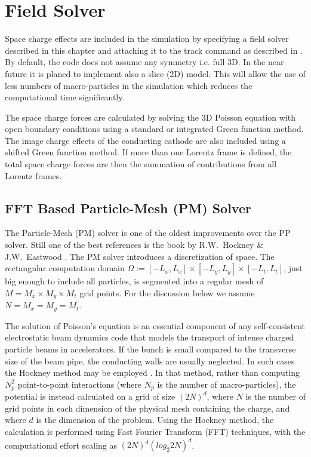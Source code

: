 

\chapter{Field Solver}
\label{chp:fieldsolver}

Space charge effects are included in the simulation by specifying a field solver described in this chapter and attaching it to the
track command as described in .
By default, the code does not assume any symmetry i.e. full 3D. In the near future it is planed to implement also a slice (2D) model.
This will allow the use of less numbers of macro-particles in the simulation which reduces the computational time significantly.

The space charge forces are calculated by solving the 3D Poisson equation with open boundary conditions
using a standard or integrated Green function method. The image charge effects of the conducting cathode are also
included using a shifted Green function method. If more than one Lorentz frame is defined, the total space charge forces are then the summation of contributions from all Lorentz frames. \latermore

\section{FFT Based Particle-Mesh (PM) Solver}
\label{sec:fieldsolver:fftbased}
The Particle-Mesh (PM) solver is one of the oldest improvements over the PP solver. Still one of the best references is the book by R.W.~Hockney \& J.W.~Eastwood \cite{hockney}.
The PM solver introduces a discretization of space. The rectangular computation domain $\Omega:=[-L_x,L_x]\times[-L_y,L_y]\times[-L_t,L_t]$, just big enough to include all particles, is segmented into a regular mesh of $M=M_x\times M_y\times M_t$ grid points. For the discussion below we assume $N=M_x=M_y=M_t$.

The solution of Poisson's equation is an essential component of any self-consistent electrostatic beam dynamics code that models the transport of intense charged particle beams in accelerators. If the bunch is small compared to the transverse size of the beam pipe, the conducting walls are usually neglected.
In such cases the Hockney method may be employed \cite{hockney, eastwoodandbrownrigg,hockneyandeastwood}. In that method, rather than computing $N_p^2$ point-to-point interactions
(where $N_p$ is the number of macro-particles), the potential is instead calculated on a grid of size $(2 N)^d$, where $N$ is the number of grid points in each dimension of the physical mesh containing
the charge, and where $d$ is the dimension of the problem.
Using the Hockney method, the calculation is performed using Fast Fourier Transform (FFT) techniques, with the computational effort scaling as $(2N)^d (log_2 2N)^d$.

